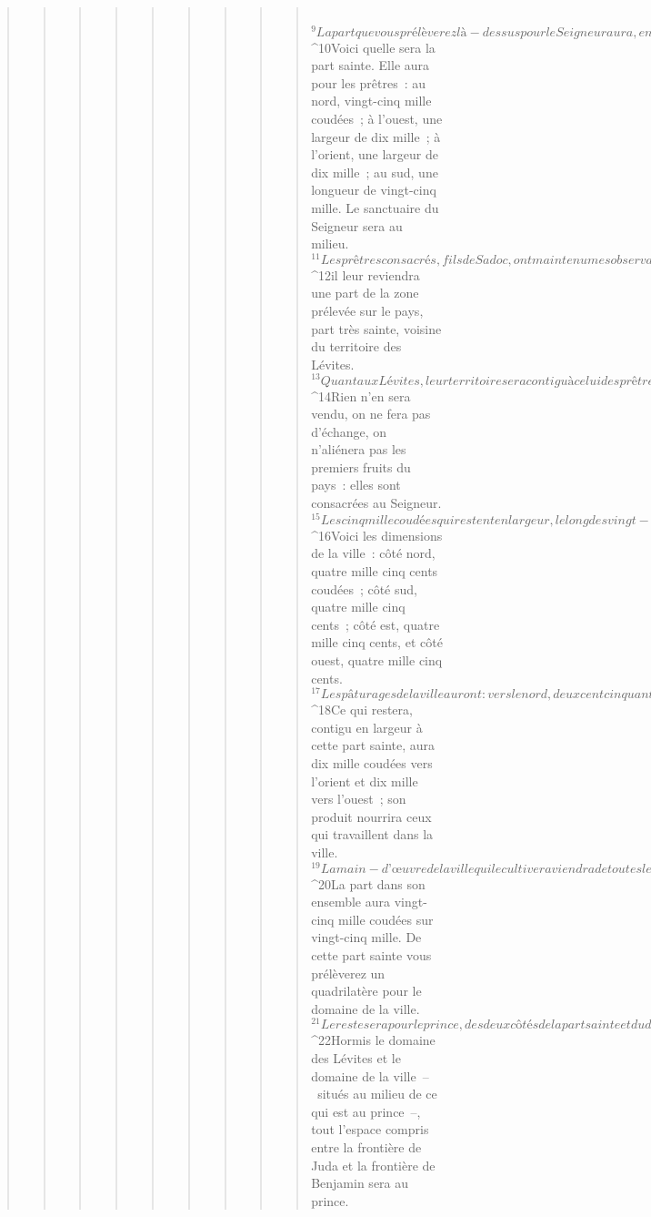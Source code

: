\begin{verse}
\begin{verse}
\begin{verse}
\begin{verse}
\begin{verse}
\begin{verse}
\begin{verse}
\begin{verse}
\begin{verse}
         
${}^{9}La part que vous prélèverez là-dessus pour le Seigneur aura, en longueur, vingt-cinq mille coudées et, en largeur, vingt mille. 
${}^{10}Voici quelle sera la part sainte. Elle aura pour les prêtres : au nord, vingt-cinq mille coudées ; à l’ouest, une largeur de dix mille ; à l’orient, une largeur de dix mille ; au sud, une longueur de vingt-cinq mille. Le sanctuaire du Seigneur sera au milieu. 
${}^{11}Les prêtres consacrés, fils de Sadoc, ont maintenu mes observances, ils ne se sont pas égarés dans l’erreur des fils d’Israël, comme les Lévites l’ont fait ; 
${}^{12}il leur reviendra une part de la zone prélevée sur le pays, part très sainte, voisine du territoire des Lévites. 
${}^{13}Quant aux Lévites, leur territoire sera contigu à celui des prêtres : vingt-cinq mille coudées en longueur et dix mille en largeur. Chacun aura une longueur de vingt-cinq mille coudées et une largeur de dix mille. 
${}^{14}Rien n’en sera vendu, on ne fera pas d’échange, on n’aliénera pas les premiers fruits du pays : elles sont consacrées au Seigneur.
${}^{15}Les cinq mille coudées qui restent en largeur, le long des vingt-cinq mille, formeront la zone profane de la ville : habitats et pâturages, la ville étant au milieu. 
${}^{16}Voici les dimensions de la ville : côté nord, quatre mille cinq cents coudées ; côté sud, quatre mille cinq cents ; côté est, quatre mille cinq cents, et côté ouest, quatre mille cinq cents. 
${}^{17}Les pâturages de la ville auront : vers le nord, deux cent cinquante coudées ; vers le sud, deux cent cinquante ; vers l’orient, deux cent cinquante et vers l’ouest deux cent cinquante. 
${}^{18}Ce qui restera, contigu en largeur à cette part sainte, aura dix mille coudées vers l’orient et dix mille vers l’ouest ; son produit nourrira ceux qui travaillent dans la ville. 
${}^{19}La main-d’œuvre de la ville qui le cultivera viendra de toutes les tribus d’Israël. 
${}^{20}La part dans son ensemble aura vingt-cinq mille coudées sur vingt-cinq mille. De cette part sainte vous prélèverez un quadrilatère pour le domaine de la ville. 
${}^{21}Le reste sera pour le prince, des deux côtés de la part sainte et du domaine de la ville. Ce qui correspond aux autres lots, le long des vingt-cinq mille coudées de la part prélevée, jusqu’à la frontière orientale, et à l’ouest, le long des vingt-cinq mille coudées, jusqu’à la frontière occidentale, ce sera pour le prince. Il y aura donc, au centre, la part sainte avec le sanctuaire de la Maison. 
${}^{22}Hormis le domaine des Lévites et le domaine de la ville – situés au milieu de ce qui est au prince –, tout l’espace compris entre la frontière de Juda et la frontière de Benjamin sera au prince.

\end{verse}
\end{verse}
\end{verse}
\end{verse}
\end{verse}
\end{verse}
\end{verse}
\end{verse}
\end{verse}
